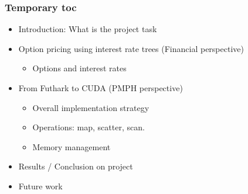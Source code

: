 \begin{frame}
  \frametitle{Temporary toc}
  \begin{itemize}
  \item Introduction: What is the project task
  \item Option pricing using interest rate trees (Financial perspective)
    \begin{itemize}
    \item Options and interest rates
    \end{itemize}
  \item From Futhark to CUDA (PMPH perspective)
    \begin{itemize}
      \item Overall implementation strategy
      \item Operations: map, scatter, scan.
      \item Memory management
    \end{itemize}
  \item Results / Conclusion on project
  \item Future work
  \end{itemize}
\end{frame}
